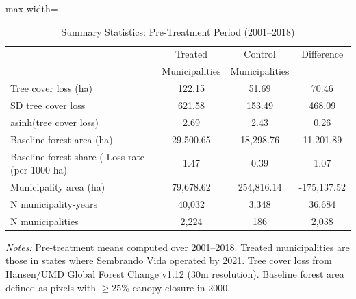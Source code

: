 \begin{table}[htbp]
\centering
\caption{Summary Statistics: Pre-Treatment Period (2001--2018)}
\label{tab:sumstats}
\begin{adjustbox}{max width=\textwidth}
\begin{tabular}{lccc}
\toprule
 & Treated & Control & Difference \\
 & Municipalities & Municipalities & \\
\midrule
Tree cover loss (ha) & 122.15 & 51.69 & 70.46 \\
SD tree cover loss & 621.58 & 153.49 & 468.09 \\
asinh(tree cover loss) & 2.69 & 2.43 & 0.26 \\
Baseline forest area (ha) & 29,500.65 & 18,298.76 & 11,201.89 \\
Baseline forest share (%
Loss rate (per 1000 ha) & 1.47 & 0.39 & 1.07 \\
Municipality area (ha) & 79,678.62 & 254,816.14 & -175,137.52 \\
N municipality-years & 40,032 & 3,348 & 36,684 \\
N municipalities & 2,224 & 186 & 2,038 \\
\bottomrule
\end{tabular}
\end{adjustbox}
\begin{tablenotes}[flushleft]
\small
\item \textit{Notes:} Pre-treatment means computed over 2001--2018. Treated municipalities are those in states where Sembrando Vida operated by 2021. Tree cover loss from Hansen/UMD Global Forest Change v1.12 (30m resolution). Baseline forest area defined as pixels with $\geq$25\% canopy closure in 2000.
\end{tablenotes}
\end{table}
